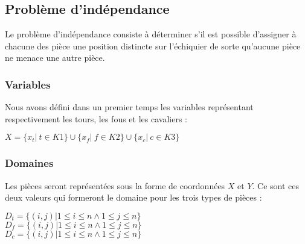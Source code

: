 \documentclass[a4paper]{article}
\begin{document}
\subsection{Problème d'indépendance}
Le problème d’indépendance consiste à déterminer s’il est possible d’assigner à chacune des pièce une position distincte sur l'échiquier de sorte qu’aucune pièce ne menace une autre pièce.\\ 
\begin{center}
\end{center}

\subsubsection{Variables}
Nous avons défini dans un premier temps les variables représentant respectivement les tours, les fous et les cavaliers : 
\begin{center}
$X = \{ x_t | \ t \in K1 \}  \cup \{ x_f | \ f \in K2 \} \cup \{ x_c | \ c \in K3 \}$
\end{center}
\subsubsection{Domaines}
Les pièces seront représentées sous la forme de coordonnées $X$ et $Y$. Ce sont ces deux valeurs qui formeront le domaine pour les trois types de pièces : 
\begin{center}
$D_t = \{ (i,j) | 1 \leq i \leq n \wedge 1 \leq j \leq n \}$ \\
$D_f = \{ (i,j) | 1 \leq i \leq n \wedge 1 \leq j \leq n \}$ \\
$D_c = \{ (i,j) | 1 \leq i \leq n \wedge 1 \leq j \leq n \}$
\end{center}
\end{document}
